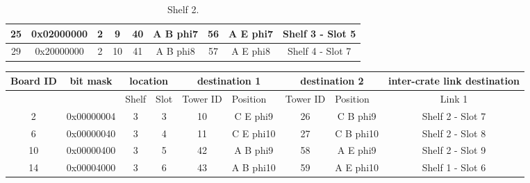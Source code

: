 \documentclass[11pt,letterpaper]{article}
\begin{document}
\begin{table}[h]
\begin{tabular}{|c|c|c|c|c|c|c|c|c|}
25                     & 0x02000000            & 2                          & 9                         & 40                            & A B phi7                      & 56                            & A E phi7                      & Shelf 3 - Slot 5             \\ \hline
29                     & 0x20000000            & 2                          & 10                        & 41                            & A B phi8                      & 57                            & A E phi8                      & Shelf 4 - Slot 7             \\ \hline
\end{tabular}
\caption{Shelf 2.}
\label{tab:shelf2}
\end{table}


\begin{table}[h]
\centering
\tiny
\begin{tabular}{|c|c|c|c|c|c|c|c|c|}
\hline
Board ID               & bit mask              & \multicolumn{2}{c|}{location}                          & \multicolumn{2}{c|}{destination 1}                            & \multicolumn{2}{c|}{destination 2}                            & inter-crate link destination \\ \hline
\multicolumn{1}{|l|}{} & \multicolumn{1}{l|}{} & \multicolumn{1}{l|}{Shelf} & \multicolumn{1}{l|}{Slot} & \multicolumn{1}{l|}{Tower ID} & \multicolumn{1}{l|}{Position} & \multicolumn{1}{l|}{Tower ID} & \multicolumn{1}{l|}{Position} & Link 1                       \\ \hline
2                      & 0x00000004            & 3                          & 3                         & 10                            & C E phi9                      & 26                            & C B phi9                      & Shelf 2 - Slot 7             \\ \hline
6                      & 0x00000040            & 3                          & 4                         & 11                            & C E phi10                     & 27                            & C B phi10                     & Shelf 2 - Slot 8             \\ \hline
10                     & 0x00000400            & 3                          & 5                         & 42                            & A B phi9                      & 58                            & A E phi9                      & Shelf 2 - Slot 9             \\ \hline
14                     & 0x00004000            & 3                          & 6                         & 43                            & A B phi10                     & 59                            & A E phi10                     & Shelf 1 - Slot 6             \\ \hline

\end{tabular}
\end{table}
\end{document}
